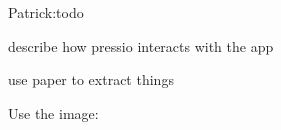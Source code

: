 Patrick\+:todo
\begin{DoxyItemize}
\item describe how pressio interacts with the app
\item use paper to extract things
\end{DoxyItemize}

Use the image\+:  